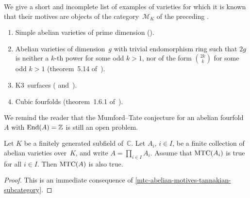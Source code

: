 \documentclass[10pt,twoside,leqno]{article}
\numberwithin{equation}{subsection}
\newcommand{\End}{\textnormal{End}}
\newcommand{\ZZ}{\mathbb{Z}}
\newcommand{\CC}{\mathbb{C}}
\newcommand{\MTC}{\textnormal{MTC}}
\begin{document}
\begin{remark} %
 We give a short and incomplete list of examples of varieties
 for which it is known that their motives
 are objects of the category~$\mathcal{M}_K$
 of the preceding .
 \begin{enumerate}
  \item Simple abelian varieties of prime dimension (\cite{Ta83}).
  \item Abelian varieties of dimension~$g$ with trivial endomorphism ring
   such that $2g$ is neither a $k$-th power for some odd $k > 1$,
   nor of the form $\binom{2k}{k}$ for some odd $k > 1$
   (theorem~5.14 of~\cite{Pi98}).
  \item K3~surfaces (\cite{MTCK3I} and~\cite{MTCK3II}).
  \item Cubic fourfolds (theorem~1.6.1 of~\cite{An96}).
 \end{enumerate}
 We remind the reader that the Mumford--Tate conjecture
 for an abelian fourfold~$A$ with $\End(A) = \ZZ$
 is still an open problem.
\end{remark}

\begin{theorem} %
 \label{mtcaxa}
 Let $K$ be a finitely generated subfield of~$\CC$.
 Let $A_i$, $i \in I$, be a finite collection of abelian varieties over~$K$,
	and write $A = \prod_{i \in I} A_i$.
 Assume that $\MTC(A_i)$ is true for all $i \in I$.
 Then $\MTC(A)$ is also true.
 \begin{proof}
  This is an immediate consequence of
  \cref{mtc-abelian-motives-tannakian-subcategory}.
 \end{proof}
\end{theorem}


\printbibliography
\end{document}
